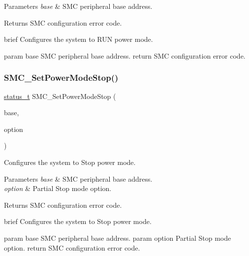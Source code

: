\begin{DoxyParams}{Parameters}
{\em base} & S\+MC peripheral base address. \\
\hline
\end{DoxyParams}
\begin{DoxyReturn}{Returns}
S\+MC configuration error code.
\end{DoxyReturn}
brief Configures the system to R\+UN power mode.

param base S\+MC peripheral base address. return S\+MC configuration error code. \mbox{\label{group__smc_gaa1e2666198ce75322be3280472a224ee}} 
\subsubsection{\texorpdfstring{SMC\_SetPowerModeStop()}{SMC\_SetPowerModeStop()}}
{\footnotesize\ttfamily \mbox{\hyperlink{group__ksdk__common_gaaabdaf7ee58ca7269bd4bf24efcde092}{status\+\_\+t}} S\+M\+C\+\_\+\+Set\+Power\+Mode\+Stop (\begin{DoxyParamCaption}\item[{\mbox{\hyperlink{struct_s_m_c___type}{S\+M\+C\+\_\+\+Type}} $\ast$}]{base,  }\item[{\mbox{\hyperlink{group__smc_gaf4ac8e3c162dfdfca1ab17fc2d78bf82}{smc\+\_\+partial\+\_\+stop\+\_\+option\+\_\+t}}}]{option }\end{DoxyParamCaption})}



Configures the system to Stop power mode. 


\begin{DoxyParams}{Parameters}
{\em base} & S\+MC peripheral base address. \\
\hline
{\em option} & Partial Stop mode option. \\
\hline
\end{DoxyParams}
\begin{DoxyReturn}{Returns}
S\+MC configuration error code.
\end{DoxyReturn}
brief Configures the system to Stop power mode.

param base S\+MC peripheral base address. param option Partial Stop mode option. return S\+MC configuration error code. \mbox{\label{group__smc_gaa1439e98fb0d82099217f822e3329b14}} 
